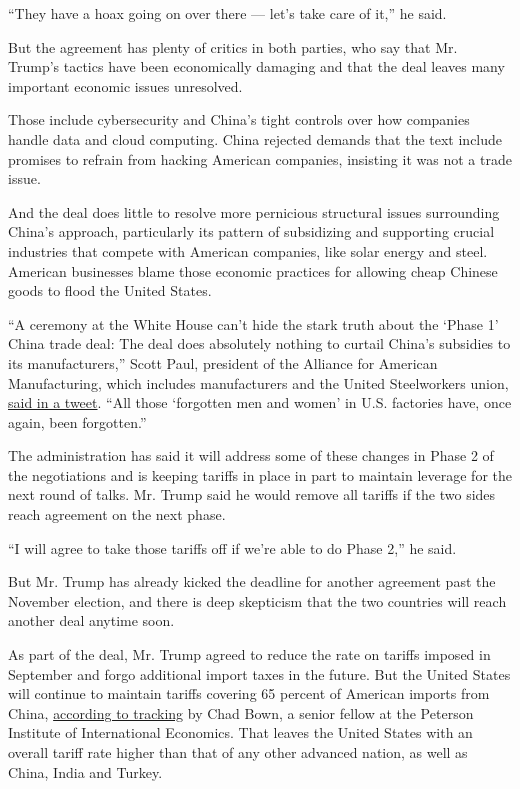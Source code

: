 ``They have a hoax going on over there --- let's take care of it,'' he
said.

But the agreement has plenty of critics in both parties, who say that
Mr. Trump's tactics have been economically damaging and that the deal
leaves many important economic issues unresolved.

Those include cybersecurity and China's tight controls over how
companies handle data and cloud computing. China rejected demands that
the text include promises to refrain from hacking American companies,
insisting it was not a trade issue.

And the deal does little to resolve more pernicious structural issues
surrounding China's approach, particularly its pattern of subsidizing
and supporting crucial industries that compete with American companies,
like solar energy and steel. American businesses blame those economic
practices for allowing cheap Chinese goods to flood the United States.

``A ceremony at the White House can't hide the stark truth about the
`Phase 1' China trade deal: The deal does absolutely nothing to curtail
China's subsidies to its manufacturers,'' Scott Paul, president of the
Alliance for American Manufacturing, which includes manufacturers and
the United Steelworkers union,
\href{https://twitter.com/ScottPaulAAM/status/1217491025079492608}{said
in a tweet}. ``All those `forgotten men and women' in U.S. factories
have, once again, been forgotten.''

The administration has said it will address some of these changes in
Phase 2 of the negotiations and is keeping tariffs in place in part to
maintain leverage for the next round of talks. Mr. Trump said he would
remove all tariffs if the two sides reach agreement on the next phase.

``I will agree to take those tariffs off if we're able to do Phase 2,''
he said.

But Mr. Trump has already kicked the deadline for another agreement past
the November election, and there is deep skepticism that the two
countries will reach another deal anytime soon.

As part of the deal, Mr. Trump agreed to reduce the rate on tariffs
imposed in September and forgo additional import taxes in the future.
But the United States will continue to maintain tariffs covering 65
percent of American imports from China,
\href{https://www.piie.com/blogs/trade-and-investment-policy-watch/phase-one-china-deal-steep-tariffs-are-new-normal}{according
to tracking} by Chad Bown, a senior fellow at the Peterson Institute of
International Economics. That leaves the United States with an overall
tariff rate higher than that of any other advanced nation, as well as
China, India and Turkey.

